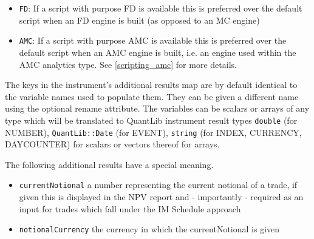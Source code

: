 \begin{itemize}
  \item \verb+FD+: If a script with purpose FD is available this is preferred over the default script when an FD engine
    is built (as opposed to an MC engine)
  \item \verb+AMC+: If a script with purpose AMC is available this is preferred over the default script when an AMC
    engine is built, i.e. an engine used within the AMC analytics type. See \ref{scripting_amc} for more details.
\end{itemize}

The keys in the instrument's additional results map are by default identical to the variable names used to populate
them. They can be given a different name using the optional rename attribute. The variables can be scalars or arrays of
any type which will be translated to QuantLib instrument result types \verb+double+ (for NUMBER), \verb+QuantLib::Date+
(for EVENT), \verb+string+ (for INDEX, CURRENCY, DAYCOUNTER) for scalars or vectors thereof for arrays.

The following additional results have a special meaning.

\begin{itemize}
\item \verb+currentNotional+ a number representing the current notional of a trade, if given this is displayed in the
  NPV report and - importantly - required as an input for trades which fall under the IM Schedule approach
\item \verb+notionalCurrency+ the currency in which the currentNotional is given
\end{itemize}

